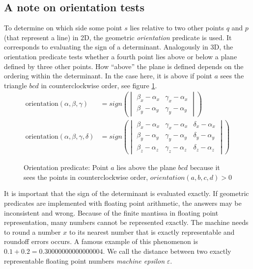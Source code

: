\documentclass[../thesis.tex]{subfiles}
\begin{document}
\subsection{A note on orientation tests}
To determine on which side some point $s$ lies relative to two other points $q$ and $p$ (that represent a line) in 2D, the geometric \emph{orientation} predicate is used.
It corresponds to evaluating the sign of a determinant. Analogously in 3D, the orientation predicate
tests whether a fourth point lies above or below a plane defined by three other points.
How ``above'' the plane is defined depends on the ordering within the determinant. In the case here,
it is above if point $a$ sees the triangle $bcd$ in counterclockwise order, see figure \ref{fig:orient2d}.
\begin{align*}
  \mathrm{orientation}(\alpha, \beta, \gamma) &= 
  sign\left(
  \begin{vmatrix}
    \beta_x -\alpha_x & \gamma_x - \alpha_x \\
    \beta_y -\alpha_y & \gamma_y - \alpha_y 
  \end{vmatrix}\right)
  \\
  \mathrm{orientation}(\alpha, \beta, \gamma, \delta) &= 
  sign\left(
  \begin{vmatrix}
    \beta_x -\alpha_x & \gamma_x - \alpha_x & \delta_x - \alpha_x \\
    \beta_y -\alpha_y & \gamma_y - \alpha_y & \delta_y - \alpha_y \\
    \beta_z -\alpha_z & \gamma_z - \alpha_z & \delta_z - \alpha_z
  \end{vmatrix}\right)
\end{align*}
\begin{figure}[htb]
  \centering
  \def\svgwidth{20em}
  
  \caption{Orientation predicate: Point $a$ lies above the plane $bcd$ because it sees the points in counterclockwise order, $orientation(a,b,c,d)>0$}
  \label{fig:orient2d}
\end{figure}
It is important that the sign of the determinant is evaluated exactly.
If geometric predicates are implemented with floating point arithmetic,
the answers may be inconsistent and wrong.
Because of the finite mantissa in floating point representation, many numbers cannot be represented exactly.
The machine needs to round a number $x$ to its nearest number that is exactly representable
and roundoff errors occurs. A famous example of this phenomenon is ${0.1 + 0.2 = 0.30000000000000004}$.
We call the distance between two exactly representable floating point numbers \emph{machine epsilon} $\varepsilon$.
\end{document}

